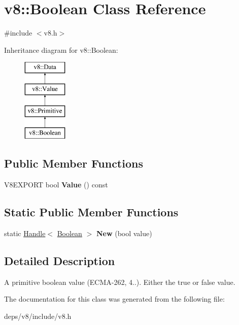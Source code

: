 \hypertarget{classv8_1_1_boolean}{}\section{v8\+:\+:Boolean Class Reference}
\label{classv8_1_1_boolean}


{\ttfamily \#include $<$v8.\+h$>$}

Inheritance diagram for v8\+:\+:Boolean\+:\begin{figure}[H]
\begin{center}
\leavevmode
\includegraphics[height=4.000000cm]{classv8_1_1_boolean}
\end{center}
\end{figure}
\subsection*{Public Member Functions}
\begin{DoxyCompactItemize}
\item 
\hypertarget{classv8_1_1_boolean_a34a8f0766f4c47db86a1a18aa751bbab}{}V8\+E\+X\+P\+O\+R\+T bool {\bfseries Value} () const \label{classv8_1_1_boolean_a34a8f0766f4c47db86a1a18aa751bbab}

\end{DoxyCompactItemize}
\subsection*{Static Public Member Functions}
\begin{DoxyCompactItemize}
\item 
\hypertarget{classv8_1_1_boolean_ade49000b88ac4ae8ea3c13cf10067132}{}static \hyperlink{classv8_1_1_handle}{Handle}$<$ \hyperlink{classv8_1_1_boolean}{Boolean} $>$ {\bfseries New} (bool value)\label{classv8_1_1_boolean_ade49000b88ac4ae8ea3c13cf10067132}

\end{DoxyCompactItemize}


\subsection{Detailed Description}
A primitive boolean value (E\+C\+M\+A-\/262, 4..). Either the true or false value. 

The documentation for this class was generated from the following file\+:\begin{DoxyCompactItemize}
\item 
deps/v8/include/v8.\+h\end{DoxyCompactItemize}
